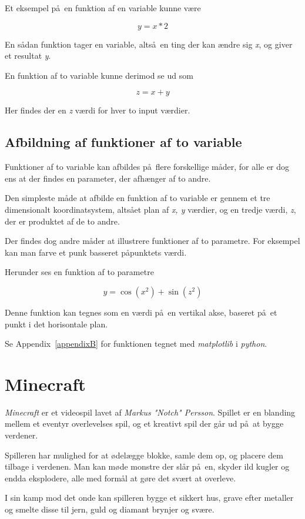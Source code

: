 \documentclass[a4paper,12pt]{report}
\begin{document}
		Et eksempel p\aa \ en funktion af en variable kunne v\ae re

		\[y = x * 2\]

		En s\aa dan funktion tager en variable, alts\aa \ en ting der kan \ae ndre sig \emph{x},
		og giver et resultat \emph{y}.

		En funktion af to variable kunne derimod se ud som

		\[z = x + y\]

		Her findes der en \emph{z} v\ae rdi for hver to input v\ae rdier.
	\section{Afbildning af funktioner af to variable}
		Funktioner af to variable kan afbildes p\aa \ flere forskellige m\aa der, for alle er dog ens at
		der findes en parameter, der afh\ae nger af to andre.

		Den simpleste m\aa de at afbilde en funktion af to variable er gennem et tre dimensionalt
		koordinatsystem, alts\aa et plan af \emph{x, y} v\ae rdier, og en tredje v\ae rdi, \emph{z},
		der er produktet af de to andre.

		Der findes dog andre m\aa der at illustrere funktioner af to parametre.
		For eksempel kan man farve et punk basseret p\aa punktets v\ae rdi.

		Herunder ses en funktion af to parametre

		\[y = \cos (x^2) + \sin (z^2)\]

		Denne funktion kan tegnes som en v\ae rdi p\aa \ en vertikal akse, baseret p\aa \ et punkt
		i det horisontale plan.
		
		Se Appendix~\ref{appendixB} for funktionen tegnet med \emph{matplotlib} i \emph{python}.
	\chapter{Minecraft}
		\emph{Minecraft} er et videospil lavet af \emph{Markus "Notch" Persson}.
		Spillet er en blanding mellem et eventyr overlevelses spil, og et kreativt spil der g\aa r ud p\aa \ at bygge verdener.

		Spilleren har mulighed for at \o del\ae gge blokke, samle dem op, og placere dem tilbage i verdenen.
		Man kan m\o de monstre der sl\aa r p\aa \ en, skyder ild kugler og endda eksplodere, alle med form\aa l
		at g\o re det sv\ae rt at overleve.

		I sin kamp mod det onde kan spilleren bygge et sikkert hus, grave efter metaller og smelte disse
		til jern, guld og diamant brynjer og sv\ae re.
\end{document}
